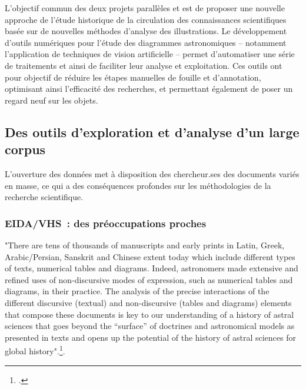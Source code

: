 L'objectif commun des deux projets parallèles \eida et \vhs est de
proposer une nouvelle approche de l'étude historique de la circulation
des connaissances scientifiques basée sur de nouvelles méthodes
d'analyse des illustrations. Le développement d'outils numériques pour
l'étude des diagrammes astronomiques -- notamment l'application de
techniques de vision artificielle -- permet d'automatiser une série de
traitements et ainsi de faciliter leur analyse et exploitation. Ces
outils ont pour objectif de réduire les étapes manuelles de fouille et
d'annotation, optimisant ainsi l'efficacité des recherches, et
permettant également de poser un regard neuf sur les objets.

\hypertarget{des-outils-dexploration-et-danalyse-dun-large-corpus}{%
\subsection{Des outils d'exploration et d'analyse d'un large
corpus}\label{des-outils-dexploration-et-danalyse-dun-large-corpus}}

L'ouverture des données met à disposition des chercheur.ses des documents
variés en masse, ce qui a des conséquences profondes sur les
méthodologies de la recherche scientifique.


\subsubsection{EIDA/VHS~: des préoccupations
proches}

\begin{kwote}
"There are tens of thousands of manuscripts and early prints in Latin,
Greek, Arabic/Persian, Sanskrit and Chinese extent today which include
different types of texts, numerical tables and diagrams. Indeed,
astronomers made extensive and refined uses of non-discursive modes of
expression, such as numerical tables and diagrams, in their practice.
The analysis of the precise interactions of the different discursive
(textual) and non-discursive (tables and diagrams) elements that compose
these documents is key to our understanding of a history of astral
sciences that goes beyond the ``surface'' of doctrines and astronomical
models as presented in texts and opens up the potential of the history
of astral sciences for global history".\footcite{husson_eida_2022}.
\end{kwote}       


